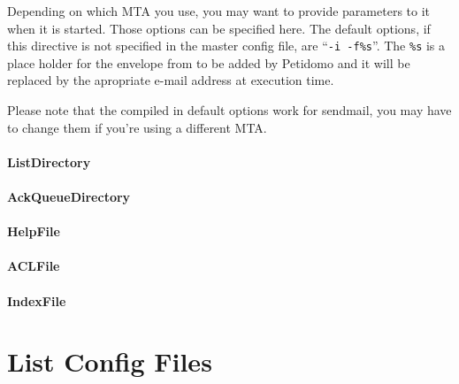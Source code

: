 \documentclass[a4paper,10pt]{scrreprt}
\begin{document}
Depending on which MTA you use, you may want to provide parameters to
it when it is started. Those options can be specified here. The
default options, if this directive is not specified in the master
config file, are ``{\tt -i -f\%s}''. The {\tt \%s} is a place holder
for the envelope from to be added by Petidomo and it will be replaced
by the apropriate e-mail address at execution time.

Please note that the compiled in default options work for sendmail,
you may have to change them if you're using a different MTA.

\paragraph{ListDirectory}

\paragraph{AckQueueDirectory}

\paragraph{HelpFile}

\paragraph{ACLFile}

\paragraph{IndexFile}

\section{List Config Files}
\end{document}
